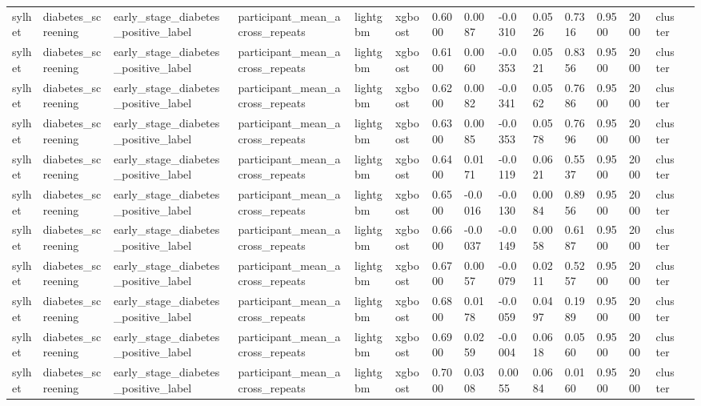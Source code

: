 \begin{tabular}{lllllllllllllll}
sylhet & diabetes\_screening & early\_stage\_diabetes\_positive\_label & participant\_mean\_across\_repeats & lightgbm & xgboost & 0.6000 & 0.0087 & -0.0310 & 0.0526 & 0.7316 & 0.9500 & 2000 & cluster &  \\
sylhet & diabetes\_screening & early\_stage\_diabetes\_positive\_label & participant\_mean\_across\_repeats & lightgbm & xgboost & 0.6100 & 0.0060 & -0.0353 & 0.0521 & 0.8356 & 0.9500 & 2000 & cluster &  \\
sylhet & diabetes\_screening & early\_stage\_diabetes\_positive\_label & participant\_mean\_across\_repeats & lightgbm & xgboost & 0.6200 & 0.0082 & -0.0341 & 0.0562 & 0.7686 & 0.9500 & 2000 & cluster &  \\
sylhet & diabetes\_screening & early\_stage\_diabetes\_positive\_label & participant\_mean\_across\_repeats & lightgbm & xgboost & 0.6300 & 0.0085 & -0.0353 & 0.0578 & 0.7696 & 0.9500 & 2000 & cluster &  \\
sylhet & diabetes\_screening & early\_stage\_diabetes\_positive\_label & participant\_mean\_across\_repeats & lightgbm & xgboost & 0.6400 & 0.0171 & -0.0119 & 0.0621 & 0.5537 & 0.9500 & 2000 & cluster &  \\
sylhet & diabetes\_screening & early\_stage\_diabetes\_positive\_label & participant\_mean\_across\_repeats & lightgbm & xgboost & 0.6500 & -0.0016 & -0.0130 & 0.0084 & 0.8956 & 0.9500 & 2000 & cluster &  \\
sylhet & diabetes\_screening & early\_stage\_diabetes\_positive\_label & participant\_mean\_across\_repeats & lightgbm & xgboost & 0.6600 & -0.0037 & -0.0149 & 0.0058 & 0.6187 & 0.9500 & 2000 & cluster &  \\
sylhet & diabetes\_screening & early\_stage\_diabetes\_positive\_label & participant\_mean\_across\_repeats & lightgbm & xgboost & 0.6700 & 0.0057 & -0.0079 & 0.0211 & 0.5257 & 0.9500 & 2000 & cluster &  \\
sylhet & diabetes\_screening & early\_stage\_diabetes\_positive\_label & participant\_mean\_across\_repeats & lightgbm & xgboost & 0.6800 & 0.0178 & -0.0059 & 0.0497 & 0.1989 & 0.9500 & 2000 & cluster &  \\
sylhet & diabetes\_screening & early\_stage\_diabetes\_positive\_label & participant\_mean\_across\_repeats & lightgbm & xgboost & 0.6900 & 0.0259 & -0.0004 & 0.0618 & 0.0560 & 0.9500 & 2000 & cluster &  \\
sylhet & diabetes\_screening & early\_stage\_diabetes\_positive\_label & participant\_mean\_across\_repeats & lightgbm & xgboost & 0.7000 & 0.0308 & 0.0055 & 0.0684 & 0.0160 & 0.9500 & 2000 & cluster &  \\

\end{tabular}
